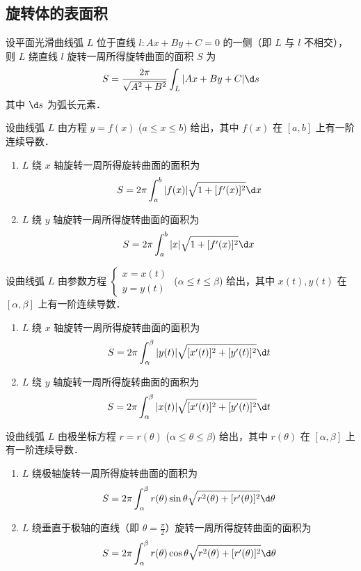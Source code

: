 \documentclass[12pt, a4paper, oneside, UTF8]{ctexbook}
\begin{document}
\subsection{旋转体的表面积}
\begin{theorem}
    设平面光滑曲线弧 $L$ 位于直线 $l: Ax+By+C=0$ 的一侧（即 $L$ 与 $l$ 不相交），则 $L$ 绕直线 $l$ 旋转一周所得旋转曲面的面积 $S$ 为
    \[
        S = \dfrac{2\pi}{\sqrt{A^2 + B^2}} \int_{L} |Ax + By + C| \d s
    \]
    其中 $\d s$ 为弧长元素．
\end{theorem}
\begin{corollary}
    设曲线弧 $L$ 由方程 $y=f(x)$ ($a \le x \le b$) 给出，其中 $f(x)$ 在 $[a, b]$ 上有一阶连续导数．
    \begin{enumerate}
        \item $L$ 绕 $x$ 轴旋转一周所得旋转曲面的面积为
        \[
            S = 2\pi \int_{a}^{b} |f(x)| \sqrt{1+[f'(x)]^2} \d x
        \]
        \item $L$ 绕 $y$ 轴旋转一周所得旋转曲面的面积为
        \[
            S = 2\pi \int_{a}^{b} |x| \sqrt{1+[f'(x)]^2} \d x
        \]
    \end{enumerate}
\end{corollary}
\begin{theorem}[参数方程形式]
    设曲线弧 $L$ 由参数方程 $\begin{cases} x=x(t) \\ y=y(t) \end{cases}$ ($\alpha \le t \le \beta$) 给出，其中 $x(t), y(t)$ 在 $[\alpha, \beta]$ 上有一阶连续导数．
    \begin{enumerate}
        \item $L$ 绕 $x$ 轴旋转一周所得旋转曲面的面积为
        \[
            S = 2\pi \int_{\alpha}^{\beta} |y(t)| \sqrt{[x'(t)]^2+[y'(t)]^2} \d t
        \]
        \item $L$ 绕 $y$ 轴旋转一周所得旋转曲面的面积为
        \[
            S = 2\pi \int_{\alpha}^{\beta} |x(t)| \sqrt{[x'(t)]^2+[y'(t)]^2} \d t
        \]
    \end{enumerate}
\end{theorem}
\begin{theorem}[极坐标形式]
    设曲线弧 $L$ 由极坐标方程 $r=r(\theta)$ ($\alpha \le \theta \le \beta$) 给出，其中 $r(\theta)$ 在 $[\alpha, \beta]$ 上有一阶连续导数．
    \begin{enumerate}
        \item $L$ 绕极轴旋转一周所得旋转曲面的面积为
        \[
            S = 2\pi \int_{\alpha}^{\beta} r(\theta)\sin\theta \sqrt{r^2(\theta)+[r'(\theta)]^2} \d \theta
        \]
        \item $L$ 绕垂直于极轴的直线（即 $\theta=\frac{\pi}{2}$）旋转一周所得旋转曲面的面积为
        \[
            S = 2\pi \int_{\alpha}^{\beta} r(\theta)\cos\theta \sqrt{r^2(\theta)+[r'(\theta)]^2} \d \theta
        \]
    \end{enumerate}
\end{theorem}
\end{document}
